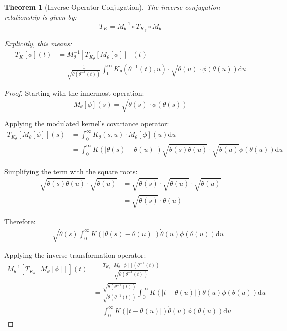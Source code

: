 \documentclass{article}
\newtheorem{theorem}{Theorem}
\newcommand{\dd}{\mathrm{d}}
\newcommand{\dottheta}{\dot{\theta}}
\begin{document}
\begin{theorem}[Inverse Operator Conjugation]
The inverse conjugation relationship is given by:
\begin{equation}
T_K = M_\theta^{-1} \circ T_{K_\theta} \circ M_\theta
\end{equation}

Explicitly, this means:
\begin{align}
T_K[\phi](t) &= M_\theta^{-1}[T_{K_\theta}[M_\theta[\phi]]](t)\\
&= \frac{1}{\sqrt{\dottheta(\theta^{-1}(t))}} \int_0^\infty K_\theta(\theta^{-1}(t),u) \cdot \sqrt{\dottheta(u)} \cdot \phi(\theta(u)) \dd u
\end{align}
\end{theorem}

\begin{proof}
Starting with the innermost operation:
\begin{equation}
M_\theta[\phi](s) = \sqrt{\dottheta(s)} \cdot \phi(\theta(s))
\end{equation}

Applying the modulated kernel's covariance operator:
\begin{align}
T_{K_\theta}[M_\theta[\phi]](s) &= \int_0^\infty K_\theta(s,u) \cdot M_\theta[\phi](u) \dd u\\
&= \int_0^\infty K(|\theta(s)-\theta(u)|) \sqrt{\dottheta(s)\dottheta(u)} \cdot \sqrt{\dottheta(u)} \phi(\theta(u)) \dd u
\end{align}

Simplifying the term with the square roots:
\begin{align}
\sqrt{\dottheta(s)\dottheta(u)} \cdot \sqrt{\dottheta(u)} &= \sqrt{\dottheta(s)} \cdot \sqrt{\dottheta(u)} \cdot \sqrt{\dottheta(u)}\\
&= \sqrt{\dottheta(s)} \cdot \dottheta(u)
\end{align}

Therefore:
\begin{align}
&= \sqrt{\dottheta(s)} \int_0^\infty K(|\theta(s)-\theta(u)|) \dottheta(u) \phi(\theta(u)) \dd u
\end{align}

Applying the inverse transformation operator:
\begin{align}
M_\theta^{-1}[T_{K_\theta}[M_\theta[\phi]]](t) &= \frac{T_{K_\theta}[M_\theta[\phi]](\theta^{-1}(t))}{\sqrt{\dottheta(\theta^{-1}(t))}}\\
&= \frac{\sqrt{\dottheta(\theta^{-1}(t))}}{\sqrt{\dottheta(\theta^{-1}(t))}} \int_0^\infty K(|t-\theta(u)|) \dottheta(u) \phi(\theta(u)) \dd u\\
&= \int_0^\infty K(|t-\theta(u)|) \dottheta(u) \phi(\theta(u)) \dd u
\end{align}


\end{proof}
\end{document}
